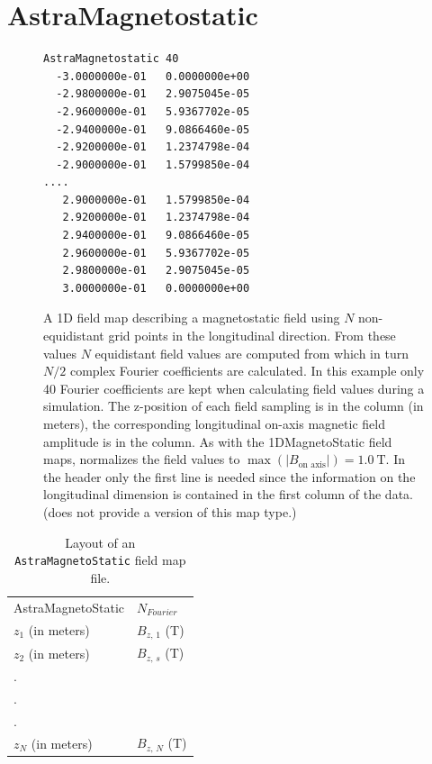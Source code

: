 \section{AstraMagnetostatic}
\label{sec: AstraMagnetostatic}
\begin{figure}[h]
  \begin{fmpage}
\begin{verbatim}
AstraMagnetostatic 40
  -3.0000000e-01   0.0000000e+00
  -2.9800000e-01   2.9075045e-05
  -2.9600000e-01   5.9367702e-05
  -2.9400000e-01   9.0866460e-05
  -2.9200000e-01   1.2374798e-04
  -2.9000000e-01   1.5799850e-04
....
   2.9000000e-01   1.5799850e-04
   2.9200000e-01   1.2374798e-04
   2.9400000e-01   9.0866460e-05
   2.9600000e-01   5.9367702e-05
   2.9800000e-01   2.9075045e-05
   3.0000000e-01   0.0000000e+00
\end{verbatim}
  \end{fmpage}
  \caption[Example of an ASTRA compatible magnetostatic field map]{A 1D field map describing a magnetostatic field using $N$
    non-equidistant grid points in the longitudinal direction. From these values $N$ equidistant field values are computed from
    which in turn $N/2$ complex Fourier coefficients are calculated. In this example only 40 Fourier coefficients are kept
    when calculating field values during a simulation. The z-position of each field sampling is in the 
    column (in meters), the corresponding longitudinal on-axis magnetic field amplitude is in the  column.
    As with the 1DMagnetoStatic  field maps, \opalt normalizes the field values to
    $\max(|B_{\text{on axis}}|) = \SI{1.0}{\tesla}$. In the header only the first line is needed since the information on the
    longitudinal dimension is contained in the first column of the data. (\opalt does not provide a  version of
    this map type.)}
  \label{fig:AstraMagnetoStatic}
\end{figure}

\begin{table}[h!]
    \caption{Layout of an \texttt{AstraMagnetoStatic} field map file.}
    \label{tab:AstraMagnetoStatic}
    \begin{center}
    \begin{tabular}{ll}
      \hline
      AstraMagnetoStatic & $N_{Fourier}$ \\
      $z_{1}$ (in meters) & $B_{z,\,1}$ (T) \\
      $z_{2}$ (in meters) & $B_{z,\,s}$ (T) \\
      . & \\
      . & \\
      . & \\
      $z_{N}$ (in meters) & $B_{z,\,N}$ (T) \\
      \hline
    \end{tabular}
    \end{center}
\end{table}

